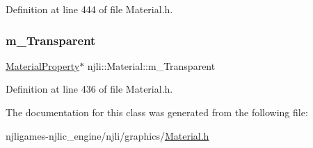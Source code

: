 Definition at line 444 of file Material.\+h.

\mbox{\label{classnjli_1_1_material_ac622968e9f93c0434701ede20d11750e}} 
\subsubsection{\texorpdfstring{m\+\_\+\+Transparent}{m\_Transparent}}
{\footnotesize\ttfamily \mbox{\hyperlink{classnjli_1_1_material_property}{Material\+Property}}$\ast$ njli\+::\+Material\+::m\+\_\+\+Transparent\hspace{0.3cm}{\ttfamily [private]}}



Definition at line 436 of file Material.\+h.



The documentation for this class was generated from the following file\+:\begin{DoxyCompactItemize}
\item 
njligames-\/njlic\+\_\+engine/njli/graphics/\mbox{\hyperlink{_material_8h}{Material.\+h}}\end{DoxyCompactItemize}
